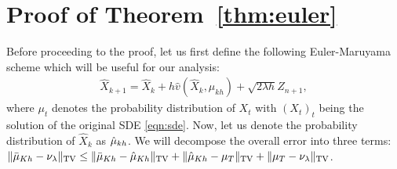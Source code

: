 





\section{Proof of Theorem~\ref{thm:euler}}

Before proceeding to the proof, let us first define the following Euler-Maruyama scheme which will be useful for our analysis:
\begin{align}
\hat{X}_{k+1}  = \hat{X}_k + h \hat{v}(\hat{X}_k, \mu_{kh}) + \sqrt{2\lambda h}Z_{n+1},
\end{align}
where $\mu_t$ denotes the probability distribution of $X_t$ with $(X_t)_t$ being the solution of the original SDE \eqref{eqn:sde}. Now, let us denote the probability distribution of $\hat{X}_k$ as $\hat{\mu}_{kh}$. 
%
We will decompose the overall error into three terms: $\| \bar{\mu}_{Kh} - \nu_\lambda \|_{\textnormal{TV}} \leq \| \bar{\mu}_{Kh} - \hat{\mu}_{Kh} \|_{\textnormal{TV}} + \| \hat{\mu}_{Kh} - \mu_T \|_{\textnormal{TV}} + \| \mu_{T} - \nu_\lambda \|_{\textnormal{TV}}$. 


